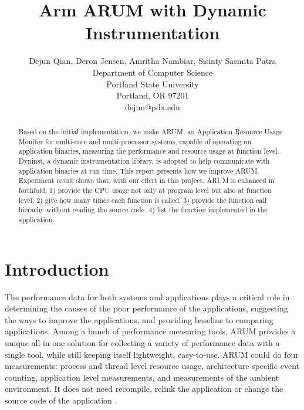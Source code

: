 \documentclass[11pt,letterpaper,oneside]{article}
\title{Arm ARUM with Dynamic Instrumentation}
\author{Dejun Qian, Deron Jensen, Amritha Nambiar, Sisinty Sasmita Patra\\Department of Computer Science\\Portland State University\\Portland, OR 97201\\dejun@pdx.edu}
\begin{document}
\maketitle

\begin{abstract}
Based on the initial implementation, we make ARUM, an Application Resource Usage Moniter for multi-core and multi-processor systems, capable of operating on application binaries, measuring the performance and resource usage at function level. Dyninst, a dynamic instrumentation library, is adopted to help communicate with application binaries at run time. This report presents how we improve ARUM. Experiment result shows that, with our effert in this project, ARUM is enhanced in forthfold, 1) provide the CPU usage not only at program level but also at function level. 2) give how many times each function is called. 3) provide the function call hierachy without reading the source code. 4) list the function implemented in the application.
\end{abstract}

\section{Introduction}
\label{sec:introduction}
The performance data for both systems and applications plays a critical role in determining the causes of the poor performance of the applications, suggesting the ways to improve the applications, and providing baseline to comparing applications. Among a bunch of performance measuring tools, ARUM provides a unique all-in-one solution for collecting a variety of performance data with a single tool, while still keeping itself lightweight, easy-to-use. ARUM could do four measurements: process and thread level resource usage, architecture specific event counting, application level measurements, and measurements of the ambient environment. It does not need recompile, relink the application or change the source code of the application \cite{bib:knapp}.
\end{document}
